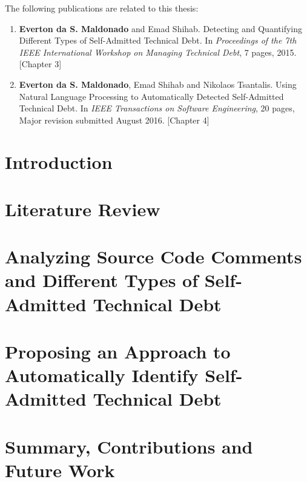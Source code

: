 \documentclass[12pt]{report}
\begin{document}
\begin{publications}

The following publications are related to this thesis:

\begin{enumerate}

\item \textbf{Everton da S. Maldonado} and Emad Shihab. Detecting and Quantifying Different Types of Self-Admitted Technical Debt. In \textit{Proceedings of the 7th IEEE International Workshop on Managing Technical Debt}, 7 pages, 2015. [Chapter 3]

\item \textbf{Everton da S. Maldonado}, Emad Shihab and Nikolaos Tsantalis. Using Natural Language Processing to Automatically Detected Self-Admitted Technical Debt. In \textit{IEEE Transactions on Software Engineering}, 20 pages, Major revision submitted August 2016. [Chapter 4] 

\end{enumerate}

\end{publications}

\chapter{Introduction}
\label{introduction}


\chapter{Literature Review}
\label{literature_review}


\chapter{Analyzing Source Code Comments and Different Types of Self-Admitted Technical Debt}
\label{chapter3}


\chapter{Proposing an Approach to Automatically Identify Self-Admitted Technical Debt}
\label{chapter4}


\chapter{Summary, Contributions and Future Work}
\label{conclusion}


  

\end{document}
